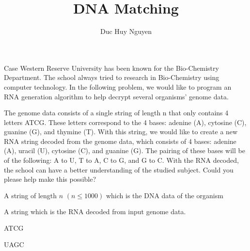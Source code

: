 \documentclass{article}
\title{DNA Matching}
\author{Duc Huy Nguyen}
\begin{document}
\begin{problemDescription}

Case Western Reserve University has been known for the Bio-Chemistry Department. The school always tried to research in Bio-Chemistry using computer technology. In the following problem, we would like to program an RNA generation algorithm to help decrypt several organisms’ genome data.

The genome data consists of a single string of length n that only contains 4 letters ATCG. These letters correspond to the 4 bases: adenine (A), cytosine (C), guanine (G), and thymine (T). With this string, we would like to create a new RNA string decoded from the genome data, which consists of 4 bases: adenine (A), uracil (U), cytosine (C), and guanine (G). The pairing of these bases will be of the following: A to U, T to A, C to G, and G to C. With the RNA decoded, the school can have a better understanding of the studied subject. Could you please help make this possible?

\end{problemDescription}

\begin{inputDescription}
    A string of length $n$ $(n \leq 1000)$ which is the DNA data of the organism
\end{inputDescription}

\begin{outputDescription}
    A string which is the RNA decoded from input genome data.
\end{outputDescription}

\begin{sampleInput}
ATCG
\end{sampleInput}
\begin{sampleOutput}
UAGC
\end{sampleOutput}
\end{document}
